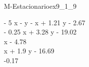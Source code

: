 
\begin{bilevelmodel}{M-Estacionario}{ex9_1_9}
    \begin{upperlevel}{0}{
        
    }
    \end{upperlevel}
    \begin{lowerlevel}{- 5 x - y}{
         - x + 1.21 y - 2.67  \\ 
 - 0.25 x + 3.28 y - 19.02  \\ 
 x - 4.78  \\ 
 x + 1.9 y - 16.69  \\ 
 -0.17 
    }
    \end{lowerlevel}
\end{bilevelmodel}
    
        